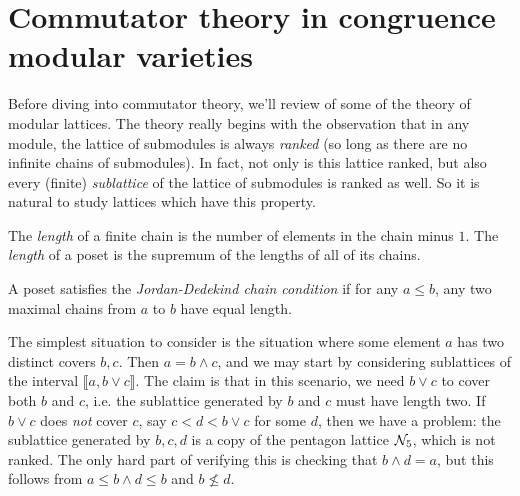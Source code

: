 \documentclass[letterpaper,11pt]{article}
\begin{document}









\appendix

\section{Commutator theory in congruence modular varieties}\label{a-commutator}

Before diving into commutator theory, we'll review of some of the theory of modular lattices. The theory really begins with the observation that in any module, the lattice of submodules is always \emph{ranked} (so long as there are no infinite chains of submodules). In fact, not only is this lattice ranked, but also every (finite) \emph{sublattice} of the lattice of submodules is ranked as well. So it is natural to study lattices which have this property.

\begin{defn} The \emph{length} of a finite chain is the number of elements in the chain minus $1$. The \emph{length} of a poset is the supremum of the lengths of all of its chains.
\end{defn}

\begin{defn} A poset satisfies the \emph{Jordan-Dedekind chain condition} if for any $a \le b$, any two maximal chains from $a$ to $b$ have equal length.
\end{defn}

The simplest situation to consider is the situation where some element $a$ has two distinct covers $b,c$. Then $a = b \wedge c$, and we may start by considering sublattices of the interval $\llbracket a, b \vee c \rrbracket$. The claim is that in this scenario, we need $b\vee c$ to cover both $b$ and $c$, i.e. the sublattice generated by $b$ and $c$ must have length two. If $b \vee c$ does \emph{not} cover $c$, say $c < d < b \vee c$ for some $d$, then we have a problem: the sublattice generated by $b,c,d$ is a copy of the pentagon lattice $\mathcal{N}_5$, which is not ranked. The only hard part of verifying this is checking that $b \wedge d = a$, but this follows from $a \le b\wedge d \le b$ and $b \not\le d$.
\end{document}
